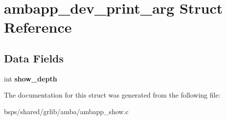 \hypertarget{structambapp__dev__print__arg}{}\section{ambapp\+\_\+dev\+\_\+print\+\_\+arg Struct Reference}
\label{structambapp__dev__print__arg}
\subsection*{Data Fields}
\begin{DoxyCompactItemize}
\item 
\mbox{\label{structambapp__dev__print__arg_ad36f73f765eb1da908c48ebfbbc0b61e}} 
int {\bfseries show\+\_\+depth}
\end{DoxyCompactItemize}


The documentation for this struct was generated from the following file\+:\begin{DoxyCompactItemize}
\item 
bsps/shared/grlib/amba/ambapp\+\_\+show.\+c\end{DoxyCompactItemize}
